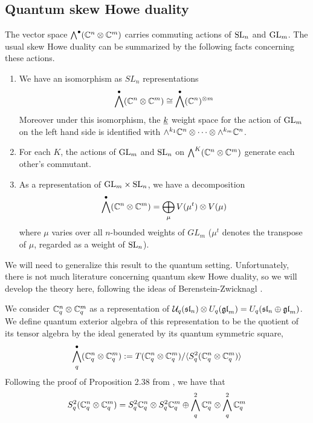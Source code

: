 \documentclass[11pt,leqno]{article}
\begin{document}
\subsection{Quantum skew Howe duality}
The vector space $\bigwedge^\bullet(\mathbb C^n \otimes \mathbb C^m)$ carries commuting actions of ${\rm{SL}}_n $ and ${\rm{GL}}_m$.  The usual skew Howe duality can be summarized by the following facts concerning these actions.
\begin{thm}\mbox{}
\begin{enumerate}
\item We have an isomorphism as $ SL_n $ representations 
\begin{equation}
 \bigwedge^\bullet(\mathbb C^n \otimes \mathbb C^m) \cong \bigwedge^\bullet({\mathbb{C}}^n)^{\otimes m}
 \end{equation}
Moreover under this isomorphism, the $ {\underline{k}} $ weight space for the action of $ {\rm{GL}}_m $ on the left hand side is identified with $\wedge^{k_1} \mathbb C^n \otimes \cdots \otimes \wedge^{k_m} \mathbb C^n$.
\item For each $ K $, the actions of $ {\rm{GL}}_m $ and $ {\rm{SL}}_n $ on $ \bigwedge^K({\mathbb{C}}^n \otimes {\mathbb{C}}^m) $ generate each other's commutant.
\item As a representation of $ {\rm{GL}}_m \times {\rm{SL}}_n  $, we have a decomposition
$$ \bigwedge^\bullet (\mathbb C^n \otimes \mathbb C^m) = \bigoplus_{\mu} V(\mu^t) \otimes V(\mu) $$
where $\mu$ varies over all $n$-bounded weights of $ GL_m$ ($\mu^t$ denotes the transpose of $\mu$, regarded as a weight of ${\rm{SL}}_n$).
\end{enumerate}
\end{thm}

We will need to generalize this result to the quantum setting.  Unfortunately, there is not much literature concerning quantum skew Howe duality, so we will develop the theory here, following the ideas of Berenstein-Zwicknagl \cite{BW}.  

We consider $ {\mathbb{C}}^n_q \otimes {\mathbb{C}}^m_q $ as a representation of $\mathcal{U}_q({\mathfrak{sl}}_n) \otimes U_q({\mathfrak{gl}}_m) = U_q({\mathfrak{sl}}_n \oplus {\mathfrak{gl}}_m) $.
We define quantum exterior algebra of this representation to be the quotient of its tensor algebra by the ideal generated by its quantum symmetric square,
$$\bigwedge^\bullet_q({\mathbb{C}}_q^n \otimes {\mathbb{C}}_q^m) := T ({\mathbb{C}}_q^n \otimes {\mathbb{C}}_q^m) / \langle S^2_q ({\mathbb{C}}_q^n \otimes {\mathbb{C}}_q^m) \rangle$$
Following the proof of Proposition 2.38 from \cite{BW}, we have that 
$$ S^2_q ({\mathbb{C}}_q^n \otimes {\mathbb{C}}_q^m) = S^2_q {\mathbb{C}}_q^n \otimes S^2_q {\mathbb{C}}_q^m \oplus \bigwedge^2_q {\mathbb{C}}_q^n \otimes \bigwedge^2_q {\mathbb{C}}_q^m $$
\end{document}
